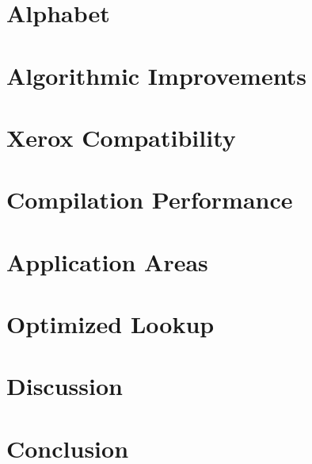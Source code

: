 \documentclass{llncs}
\begin{document}
\section{Alphabet}

\section{Algorithmic Improvements}

\section{Xerox Compatibility}

\section{Compilation Performance}

\section{Application Areas}

\section{Optimized Lookup}\label{optimized-lookup}

\section{Discussion}

\section{Conclusion}

%
%
%
%
\begin{thebibliography}{}

\end{thebibliography}
\end{document}
